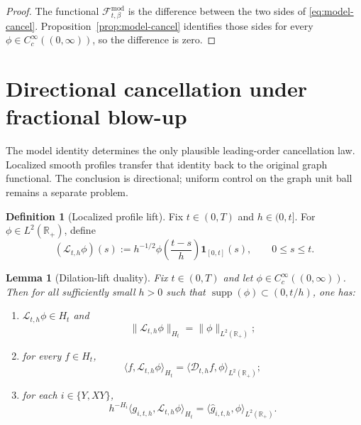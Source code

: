 \documentclass[11pt,a4paper]{amsart}
\theoremstyle{plain}
\newtheorem{lemma}[theorem]{Lemma}
\theoremstyle{definition}
\newtheorem{definition}[theorem]{Definition}
\theoremstyle{remark}
\newcommand{\R}{\mathbb{R}}
\newcommand{\one}{\mathbf 1}
\begin{document}
\begin{proof}
The functional \(\mathcal F_{t,\beta}^{\mathrm{mod}}\) is the difference between the two sides of
\eqref{eq:model-cancel}.  Proposition~\ref{prop:model-cancel} identifies those sides for every
\(\phi\in C_c^\infty((0,\infty))\), so the difference is zero.
\end{proof}

\section{Directional cancellation under fractional blow-up}\label{sec:directional}

The model identity determines the only plausible leading-order cancellation law.  Localized smooth
profiles transfer that identity back to the original graph functional.  The conclusion is
directional; uniform control on the graph unit ball remains a separate problem.

\begin{definition}[Localized profile lift]\label{def:lift}
Fix $t\in(0,T)$ and $h\in(0,t]$. For $\phi\in L^2(\R_+)$, define
\begin{equation}\label{eq:lift}
(\mathcal L_{t,h}\phi)(s)
:=
h^{-1/2}\phi\!\left(\frac{t-s}{h}\right)\one_{[0,t]}(s),
\qquad 0\le s\le t.
\end{equation}
\end{definition}

\begin{lemma}[Dilation-lift duality]\label{lem:lift-duality}
Fix $t\in(0,T)$ and let $\phi\in C_c^\infty((0,\infty))$. Then for all sufficiently small
$h>0$ such that $\operatorname{supp}(\phi)\subset(0,t/h)$, one has:
\begin{enumerate}[label=(\roman*)]
\item $\mathcal L_{t,h}\phi\in H_t$ and
\[
\|\mathcal L_{t,h}\phi\|_{H_t}=\|\phi\|_{L^2(\R_+)};
\]
\item for every $f\in H_t$,
\begin{equation}\label{eq:lift-dual}
\langle f,\mathcal L_{t,h}\phi\rangle_{H_t}
=
\langle \mathcal D_{t,h}f,\phi\rangle_{L^2(\R_+)};
\end{equation}
\item for each $i\in\{Y,XY\}$,
\begin{equation}\label{eq:lift-gh}
h^{-H_i}\langle g_{i,t,h},\mathcal L_{t,h}\phi\rangle_{H_t}
=
\langle \widehat g_{i,t,h},\phi\rangle_{L^2(\R_+)}.
\end{equation}
\end{enumerate}
\end{lemma}
\end{document}
